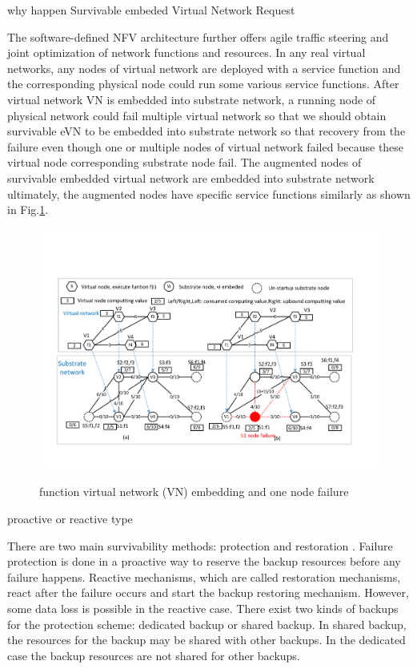why happen Survivable embeded Virtual Network Request

The software-defined NFV architecture further offers agile traffic steering and joint optimization of network functions and resources.
In any real virtual networks, any nodes of virtual network  are deployed with a service function and the corresponding physical node could run some various service functions. After virtual network VN is embedded into substrate network, a running node of physical network could fail multiple virtual network so that we should obtain survivable eVN to be embedded into substrate network so that recovery from the failure even though one or multiple nodes of virtual network failed because these virtual node corresponding substrate node fail. The augmented nodes of survivable embedded virtual network are embedded into substrate network ultimately, the augmented nodes have specific service functions similarly as shown in Fig.\ref{fig:VNmapSN}.

\begin{figure}
  \centering
  \includegraphics[width=5in]{Fig/VNmapSN}\\
  \caption{function virtual network (VN) embedding and one node failure}\label{fig:VNmapSN}
\end{figure}

proactive or reactive type

There are two main survivability methods: protection and restoration \cite{ramamurthy2003survivable}. Failure protection is done in a proactive way to reserve the backup resources before any failure happens. Reactive mechanisms, which are called restoration mechanisms, react after the failure occurs and start the backup restoring mechanism. However, some data loss is possible in the reactive case. There exist two kinds of backups for the protection scheme: dedicated backup or shared backup. In shared backup, the resources for the backup may be shared with other backups. In the dedicated case the backup resources are not shared for other backups.



